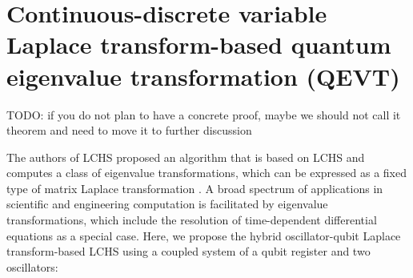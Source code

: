 \documentclass{article}
\newcommand{\cb}[1]{{\color{blue}#1}}
\begin{document}

\section{Continuous-discrete variable Laplace transform-based quantum eigenvalue transformation (QEVT)}

\cb{TODO: if you do not plan to have a concrete proof, maybe we should not call it theorem and need to move it to further discussion}

The authors of LCHS proposed an algorithm that is based on LCHS and computes a class of eigenvalue transformations, which can be expressed as a fixed type of matrix Laplace transformation \cite{an2024laplacetransformbasedquantum}. A broad spectrum of applications in scientific and engineering computation is facilitated by eigenvalue transformations, which include the resolution of time-dependent differential equations as a special case. Here, we propose the hybrid oscillator-qubit Laplace transform-based LCHS using a coupled system of a qubit register and two oscillators: 
\end{document}
